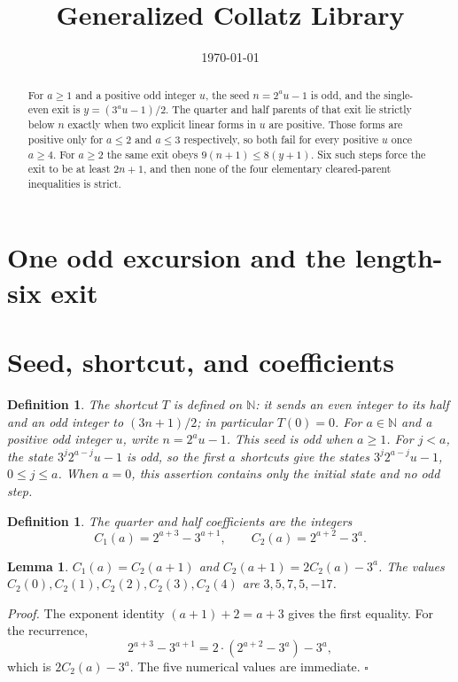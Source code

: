 \documentclass[11pt,letterpaper]{article}
\title{Generalized Collatz Library}
\author{}
\date{\today}
\newcommand{\N}{\mathbb{N}}
\newtheorem{lemma}[theorem]{Lemma}
\newtheorem{definition}[theorem]{Definition}
\newenvironment{proof}{\noindent\textit{Proof.}}{\hfill\(\square\)}
\begin{document}
\maketitle
\section*{One odd excursion and the length-six exit}

\begin{abstract}
For \(a\ge1\) and a positive odd integer \(u\), the seed \(n=2^a u-1\) is odd, and the single-even exit is \(y=(3^a u-1)/2\). The quarter and half parents of that exit lie strictly below \(n\) exactly when two explicit linear forms in \(u\) are positive. Those forms are positive only for \(a\le 2\) and \(a\le 3\) respectively, so both fail for every positive \(u\) once \(a\ge 4\). For \(a\ge 2\) the same exit obeys \(9(n+1)\le 8(y+1)\). Six such steps force the exit to be at least \(2n+1\), and then none of the four elementary cleared-parent inequalities is strict.
\end{abstract}

\section{Seed, shortcut, and coefficients}

\begin{definition}
The shortcut \(T\) is defined on \(\N\): it sends an even integer to its half and an odd integer to \((3n+1)/2\); in particular \(T(0)=0\). For \(a\in\N\) and a positive odd integer \(u\), write \(n=2^a u-1\). This seed is odd when \(a\ge1\). For \(j<a\), the state \(3^j2^{a-j}u-1\) is odd, so the first \(a\) shortcuts give the states \(3^j2^{a-j}u-1\), \(0\le j\le a\). When \(a=0\), this assertion contains only the initial state and no odd step.
\end{definition}

\begin{definition}
The quarter and half coefficients are the integers
\[
C_1(a)=2^{a+3}-3^{a+1},\qquad C_2(a)=2^{a+2}-3^a.
\]
\end{definition}

\begin{lemma}
\label{lem:recurrence}
\(C_1(a)=C_2(a+1)\) and \(C_2(a+1)=2C_2(a)-3^a\). The values \(C_2(0),C_2(1),C_2(2),C_2(3),C_2(4)\) are \(3,5,7,5,-17\).
\end{lemma}

\begin{proof}
The exponent identity \((a+1)+2=a+3\) gives the first equality. For the recurrence,
\[
2^{a+3}-3^{a+1}=2\cdot(2^{a+2}-3^a)-3^a,
\]
which is \(2C_2(a)-3^a\). The five numerical values are immediate.
\end{proof}
\end{document}
